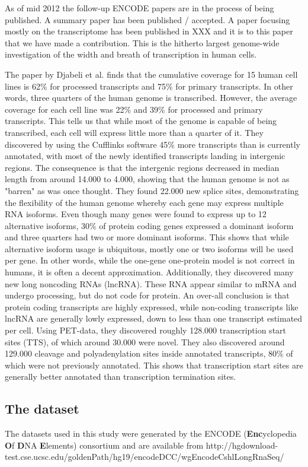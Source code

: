 As of mid 2012 the follow-up ENCODE papers are in the process of being
published. A summary paper has been published / accepted. A paper focusing
mostly on the transcriptome has been published in XXX and it is to this paper
that we have made a contribution. This is the hitherto largest genome-wide
investigation of the width and breath of transcription in human cells.

The paper by Djabeli et al. finds that the cumulative coverage for 15 human
cell lines is 62\% for processed transcripts and 75\% for primary transcripts.
In other words, three quarters of the human genome is transcribed. However, the
average coverage for each cell line was 22\% and 39\% for processed and primary
transcripts. This tells us that while most of the genome is capable of being
transcribed, each cell will express little more than a quarter of it. They
discovered by using the Cufflinks software 45\% more transcripts than is
currently annotated, with most of the newly identified transcripts landing in
intergenic regions. The consequence is that the intergenic regions decreased in
median length from around 14.000 to 4.000, showing that the human genome is not
as "barren" as was once thought. They found 22.000 new splice sites,
demonstrating the flexibility of the human genome whereby each gene may express
multiple RNA isoforms. Even though many genes were found to express up to 12
alternative isoforms, 30\% of protein coding genes expressed a dominant isoform
and three quarters had two or more dominant isoforms. This shows that while
alternative isoform usage is ubiquitous, mostly one or two isoforms will be
used per gene. In other words, while the one-gene one-protein model is not
correct in humans, it is often a decent approximation. Additionally, they
discovered many new long noncoding RNAs (lncRNA). These RNA appear similar to
mRNA and undergo processing, but do not code for protein. An over-all
conclusion is that protein coding transcripts are highly expressed, while
non-coding transcripts like lncRNA are generally lowly expressed, down to less
than one transcript estimated per cell. Using PET-data, they discovered roughly
128.000 transcription start sites (TTS), of which around 30.000 were novel.
They also discovered around 129.000 cleavage and polyadenylation sites inside
annotated transcripts, 80\% of which were not previously annotated. This shows
that transcription start sites are generally better annotated than
transcription termination sites.


\subsection{The dataset}
The datasets used in this study were generated by the ENCODE
(\textbf{Enc}yclopedia \textbf{O}f \textbf{D}NA \textbf{E}lements) consortium
and are available from http://hgdownload-test.cse.ucsc.edu/goldenPath/hg19/encodeDCC/wgEncodeCshlLongRnaSeq/

